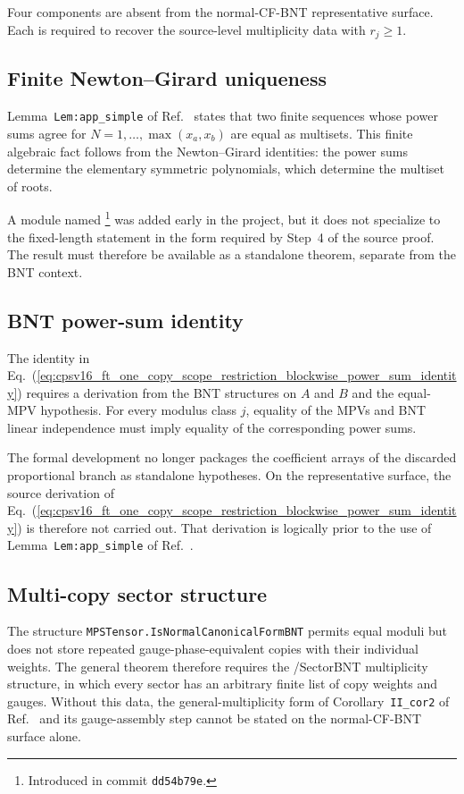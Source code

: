 \documentclass{article}
\begin{document}
Four components are absent from the normal-CF-BNT representative surface.
Each is required to recover the source-level multiplicity data with
$r_j\geq1$.

\subsection{Finite Newton--Girard uniqueness}

Lemma~\texttt{Lem:app\_simple} of Ref.~\cite{Cirac2016MPDO_arXiv} states that
two finite sequences whose power sums agree for
$N=1,\ldots,\max(x_a,x_b)$ are equal as multisets. This finite algebraic fact
follows from the Newton--Girard identities: the power sums determine the
elementary symmetric polynomials, which determine the multiset of roots.

A module named \footnote{Introduced in commit
\texttt{dd54b79e}.} was added early in the project, but it does not specialize
to the fixed-length statement in the form required by Step~4 of the source
proof. The result must therefore be available as a standalone theorem,
separate from the BNT context.

\subsection{BNT power-sum identity}

The identity in
Eq.~(\ref{eq:cpsv16_ft_one_copy_scope_restriction_blockwise_power_sum_identity})
requires a derivation from the BNT structures on $A$ and $B$ and the equal-MPV
hypothesis. For every modulus class $j$, equality of the MPVs and BNT linear
independence must imply equality of the corresponding power sums.

The formal development no longer packages the coefficient arrays of the
discarded proportional branch as standalone hypotheses. On the representative
surface, the source derivation of
Eq.~(\ref{eq:cpsv16_ft_one_copy_scope_restriction_blockwise_power_sum_identity})
is therefore not carried out. That derivation is logically prior to the use
of Lemma~\texttt{Lem:app\_simple} of
Ref.~\cite{Cirac2016MPDO_arXiv}.

\subsection{Multi-copy sector structure}

The structure \texttt{MPSTensor.IsNormalCanonicalFormBNT} permits equal moduli but does
not store repeated gauge-phase-equivalent copies with their individual
weights. The general theorem therefore requires the
/SectorBNT multiplicity structure, in which every
sector has an arbitrary finite list of copy weights and gauges. Without this
data, the general-multiplicity form of Corollary~\texttt{II\_cor2} of
Ref.~\cite{Cirac2016MPDO_arXiv} and its gauge-assembly step cannot be stated on
the normal-CF-BNT surface alone.
\end{document}
